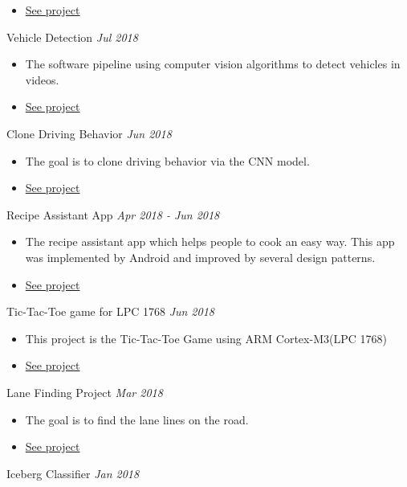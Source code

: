 \documentclass[10pt]{article}
\newenvironment{changemargin}[2]{
  \begin{list}{}{
    \setlength{\topsep}{0pt}
    \setlength{\leftmargin}{#1}
    \setlength{\rightmargin}{#2}
    \setlength{\listparindent}{\parindent}
    \setlength{\itemindent}{\parindent}
    \setlength{\parsep}{\parskip}
  }
  \item[]}{\end{list}
}
\newcommand{\project}[2]{
	{#1} \hfill \emph{#2}\\ \medskip
}
\newenvironment{body} {
	\vspace*{-16pt}
	\begin{changemargin}{-0.25in}{-0.5in}
  }
	{\end{changemargin}
}
\begin{document}
\begin{body}
\begin{itemize}
      \item \href{https://github.com/jeongwhanchoi/CarND-Advanced-Lane-Lines}{See project}
  	\end{itemize}
\project{Vehicle Detection}{Jul 2018}
\begin{itemize} \itemsep -0pt  %
      \item  The software pipeline using computer vision algorithms to detect vehicles in videos.
      \item \href{https://github.com/jeongwhanchoi/CarND-Vehicle-Detection}{See project}
  	\end{itemize}
\project{Clone Driving  Behavior}{Jun 2018}
\begin{itemize} \itemsep -0pt  %
      \item  The goal is to clone driving behavior via the CNN model.
      \item \href{https://github.com/jeongwhanchoi/CarND-Behavioral-Cloning}{See project}
  	\end{itemize}
\project{Recipe Assistant App}{Apr 2018 - Jun 2018}
\begin{itemize} \itemsep -0pt  %
      \item  The recipe assistant app which helps people to cook an easy way. This app was implemented by Android and improved by several design patterns.
      \item \href{https://github.com/jeongwhanchoi/recipe-assistant-app}{See project}
  	\end{itemize}
\project{Tic-Tac-Toe game for LPC 1768}{Jun 2018}
\begin{itemize} \itemsep -0pt  %
      \item  This project is the Tic-Tac-Toe Game using ARM Cortex-M3(LPC 1768)
      \item \href{https://github.com/jeongwhanchoi/tic-tac-toe-lpc1768}{See project}
  	\end{itemize}
\project{Lane Finding Project}{Mar 2018}
\begin{itemize} \itemsep -0pt  %
      \item  The goal is to find the lane lines on the road.
      \item \href{https://github.com/jeongwhanchoi/CarND-LaneLines}{See project}
  	\end{itemize}
\project{Iceberg Classifier}{Jan 2018}
\begin{itemize} \itemsep -0pt  %

\end{itemize}
\end{body}
\end{document}

